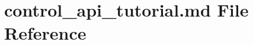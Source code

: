\hypertarget{control__api__tutorial_8md}{}\section{control\+\_\+api\+\_\+tutorial.\+md File Reference}
\label{control__api__tutorial_8md}
